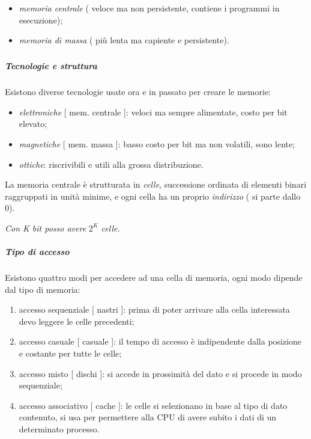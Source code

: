 \begin{itemize}
\item
  \emph{memoria centrale} ( veloce ma non persistente, contiene i
  programmi in esecuzione);
\item
  \emph{memoria di massa} ( più lenta ma capiente e persistente).
\end{itemize}

\subparagraph{}\label{section-4}

\subparagraph{\texorpdfstring{\emph{Tecnologie e
struttura}}{Tecnologie e struttura}}\label{tecnologie-e-struttura}

Esistono diverse tecnologie usate ora e in passato per creare le
memorie:

\begin{itemize}
\item
  \emph{elettroniche} {[} mem. centrale {]}: veloci ma sempre
  alimentate, costo per bit elevato;
\item
  \emph{magnetiche} {[} mem. massa {]}: basso costo per bit ma non
  volatili, sono lente;
\item
  \emph{ottiche}: riscrivibili e utili alla grossa distribuzione.
\end{itemize}

La memoria centrale è strutturata in \emph{celle}, successione ordinata
di elementi binari raggruppati in unità minime, e ogni cella ha un
proprio \emph{indirizzo} ( si parte dallo 0).

\emph{Con K bit posso avere} \(2^{K}\) \emph{celle.}

\subparagraph{\texorpdfstring{\emph{Tipo di
accesso}}{Tipo di accesso}}\label{tipo-di-accesso}

Esistono quattro modi per accedere ad una cella di memoria, ogni modo
dipende dal tipo di memoria:

\begin{enumerate}
\def\labelenumi{\arabic{enumi}.}
\item
  accesso sequenziale {[} nastri {]}: prima di poter arrivare alla cella
  interessata devo leggere le celle precedenti;
\item
  accesso casuale {[} casuale {]}: il tempo di accesso è indipendente
  dalla posizione e costante per tutte le celle;
\item
  accesso misto {[} dischi {]}: si accede in prossimità del dato e si
  procede in modo sequenziale;
\item
  accesso associativo {[} cache {]}: le celle si selezionano in base al
  tipo di dato contenuto, si usa per permettere alla CPU di avere subito
  i dati di un determinato processo.
\end{enumerate}

